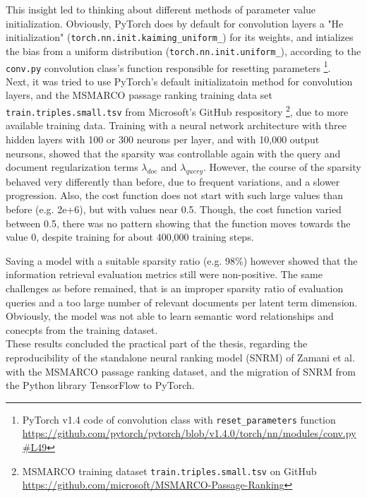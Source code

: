 This insight led to thinking about different methods of parameter value initialization.
Obviously, PyTorch does by default for convolution layers a 
    "He initialization" (\texttt{torch.nn.init.kaiming\_uniform\_}) for its weights,
    and intializes the bias from a uniform distribution (\texttt{torch.nn.init.uniform\_}),
    according to the \texttt{conv.py} convolution class's function
    responsible for resetting parameters
    \footnote{PyTorch v1.4 code of convolution class with \texttt{reset\_parameters} function \url{https://github.com/pytorch/pytorch/blob/v1.4.0/torch/nn/modules/conv.py\#L49}}.\\
Next, it was tried to use PyTorch's default initializatoin method for convolution layers,
    and the MSMARCO passage ranking training data set \texttt{train.triples.small.tsv} from Microsoft's 
    GitHub respository
    \footnote{MSMARCO training dataset \texttt{train.triples.small.tsv} on GitHub \url{https://github.com/microsoft/MSMARCO-Passage-Ranking}},
    due to more available training data.
Training with a neural network architecture with three hidden layers with 100 or 300 neurons per layer,
    and with 10,000 output neursons, showed that the sparsity was controllable again with 
    the query and document regularization terms $\lambda_{doc}$ and $\lambda_{query}$.
However, the course of the sparsity behaved very differently than before, due to frequent variations,
    and a slower progression.
Also, the cost function does not start with such large values than before (e.g. 2e+6),
    but with values near 0.5.
Though, the cost function varied between 0.5, there was no pattern showing that the function moves 
    towards the value 0, despite training for about 400,000 training steps.

Saving a model with a suitable sparsity ratio (e.g. 98\%) however showed that the information retrieval
    evaluation metrics still were non-positive.
The same challenges as before remained, that is an improper sparsity ratio of evaluation queries and 
    a too large number of relevant documents per latent term dimension.
Obviously, the model was not able to learn semantic word relationships and conecpts 
    from the training dataset.\\
These results concluded the practical part of the thesis, regarding the reproducibility of the 
    standalone neural ranking model (SNRM) of
    Zamani et al. \cite{zamani:2018:from-neural-reranking-to-neural-ranking}
    with the MSMARCO passage ranking dataset, 
    and the migration of SNRM from the Python library TensorFlow to PyTorch.

